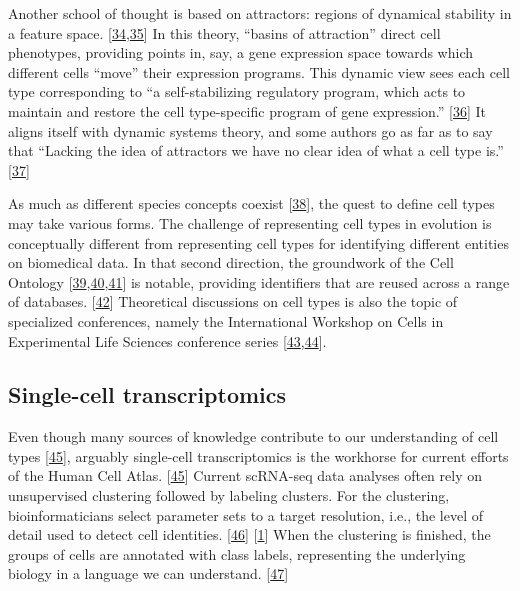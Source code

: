 Another school of thought is based on attractors: regions of dynamical stability in a feature space. {[}\protect\hyperlink{ref-14J9lsoMd}{34},\protect\hyperlink{ref-OjxQDZpx}{35}{]}
In this theory, ``basins of attraction'' direct cell phenotypes, providing points in, say, a gene expression space towards which different cells ``move'' their expression programs.
This dynamic view sees each cell type corresponding to ``a self-stabilizing regulatory program, which acts to maintain and restore the cell type-specific program of gene expression.'' {[}\protect\hyperlink{ref-19g5Iusf9}{36}{]}
It aligns itself with dynamic systems theory, and some authors go as far as to say that ``Lacking the idea of attractors we have no clear idea of what a cell type is.'' {[}\protect\hyperlink{ref-4TJnL1xT}{37}{]}

As much as different species concepts coexist {[}\protect\hyperlink{ref-g74dZjOM}{38}{]}, the quest to define cell types may take various forms.
The challenge of representing cell types in evolution is conceptually different from representing cell types for identifying different entities on biomedical data.
In that second direction, the groundwork of the Cell Ontology {[}\protect\hyperlink{ref-1CI8uS6ka}{39},\protect\hyperlink{ref-gAysgnsS}{40},\protect\hyperlink{ref-17U3pGEjv}{41}{]} is notable, providing identifiers that are reused across a range of databases. {[}\protect\hyperlink{ref-qT8WxqjA}{42}{]}
Theoretical discussions on cell types is also the topic of specialized conferences, namely the International Workshop on Cells in Experimental Life Sciences conference series {[}\protect\hyperlink{ref-jX2ZmXcc}{43},\protect\hyperlink{ref-rK8KD0us}{44}{]}.

\hypertarget{single-cell-transcriptomics}{%
\subsection{Single-cell transcriptomics}\label{single-cell-transcriptomics}}

Even though many sources of knowledge contribute to our understanding of cell types {[}\protect\hyperlink{ref-16phbXNJE}{45}{]}, arguably single-cell transcriptomics is the workhorse for current efforts of the Human Cell Atlas. {[}\protect\hyperlink{ref-16phbXNJE}{45}{]}
Current scRNA-seq data analyses often rely on unsupervised clustering followed by labeling clusters.
For the clustering, bioinformaticians select parameter sets to a target resolution, i.e., the level of detail used to detect cell identities. {[}\protect\hyperlink{ref-WKbly37M}{46}{]} {[}\protect\hyperlink{ref-1GmbExweg}{1}{]}
When the clustering is finished, the groups of cells are annotated with class labels, representing the underlying biology in a language we can understand. {[}\protect\hyperlink{ref-ii1dVqoy}{47}{]}

